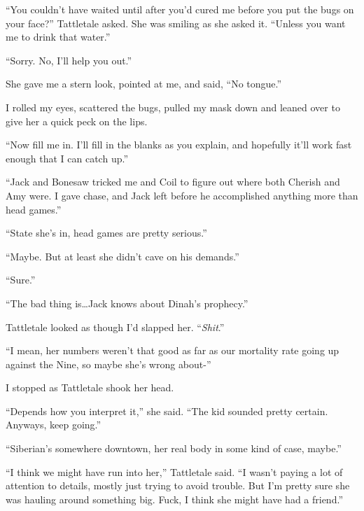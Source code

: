 ``You couldn't have waited until after you'd cured me before you put the bugs on your face?''  Tattletale asked.  She was smiling as she asked it.  ``Unless you want me to drink that water.''



``Sorry.  No, I'll help you out.''



She gave me a stern look, pointed at me, and said, ``No tongue.''



I rolled my eyes, scattered the bugs, pulled my mask down and leaned over to give her a quick peck on the lips.



``Now fill me in.  I'll fill in the blanks as you explain, and hopefully it'll work fast enough that I can catch up.''



``Jack and Bonesaw tricked me and Coil to figure out where both Cherish and Amy were.  I gave chase, and Jack left before he accomplished anything more than head games.''



``State she's in, head games are pretty serious.''



``Maybe.  But at least she didn't cave on his demands.''



``Sure.''



``The bad thing is\ldots Jack knows about Dinah's prophecy.''



Tattletale looked as though I'd slapped her.  ``\emph{Shit}.''



``I mean, her numbers weren't that good as far as our mortality rate going up against the Nine, so maybe she's wrong about-''



I stopped as Tattletale shook her head.



``Depends how you interpret it,'' she said. ``The kid sounded pretty certain.  Anyways, keep going.''



``Siberian's somewhere downtown, her real body in some kind of case, maybe.''



``I think we might have run into her,'' Tattletale said.  ``I wasn't paying a lot of attention to details, mostly just trying to avoid trouble.  But I'm pretty sure she was hauling around something big.  Fuck, I think she might have had a friend.''



